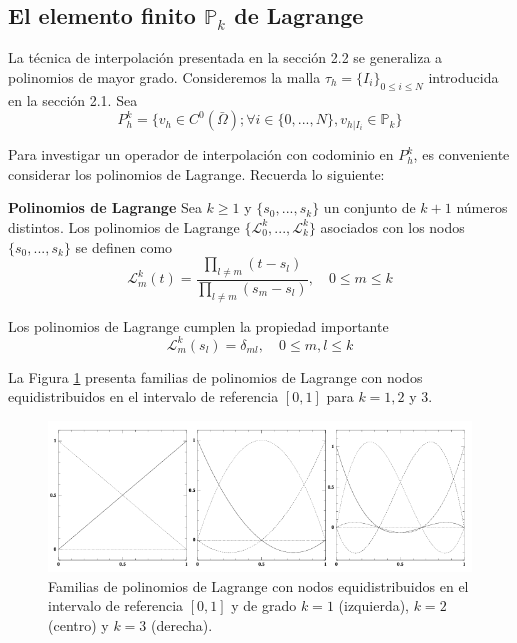 \subsection{El elemento finito $\mathbb{P}_k$ de Lagrange}
La técnica de interpolación presentada en la sección 2.2 se generaliza a polinomios de mayor grado. Consideremos la malla $\tau_h = \{I_i\}_{0 \leq i \leq N}$ introducida en la sección 2.1. Sea 
\begin{equation}
    \label{eq: TAMU 1.14}
    P_h^k = \{ v_h \in C^0 (\bar{\Omega}); \forall i \in \{ 0,..., N \}, v_{h|I_i} \in \mathbb{P}_k \}
\end{equation}

Para investigar un operador de interpolación con codominio en $P_h^k$, es conveniente considerar los polinomios de Lagrange. Recuerda lo siguiente:

\begin{definition}
    \textbf{Polinomios de Lagrange} Sea $k \geq 1$ y $\{ s_0, ..., s_k \}$ un conjunto de $k + 1$ números distintos. Los polinomios de Lagrange $\{ \mathcal{L}_0^k, ..., \mathcal{L}_k^k \}$ asociados con los nodos $\{ s_0, ..., s_k \}$ se definen como 
    \begin{equation}
        \label{eq: TAMU 1.15}
        \mathcal{L}_m^k(t) = \frac{\prod_{l \neq m} (t - s_l)}{\prod_{l \neq m}(s_m - s_l)}, \quad 0 \leq m \leq k
    \end{equation}
\end{definition}

Los polinomios de Lagrange cumplen la propiedad importante
\[ \mathcal{L}_m^k (s_l) = \delta_{ml}, \quad 0 \leq m, l \leq k \]

La Figura \ref{fig: Familias de Polinomios de Lagrange} presenta familias de polinomios de Lagrange con nodos equidistribuidos en el intervalo de referencia $[0, 1]$ para $k = 1, 2$ y $3$.

\begin{figure}[h]
    \centering
    \includegraphics[width = 0.5 \textwidth]{Imagenes/4 - Familias de Polinomios de Lagrange.png}
    \caption{Familias de polinomios de Lagrange con nodos equidistribuidos en el intervalo de referencia $[0, 1]$ y de grado $k = 1$ (izquierda), $k = 2$ (centro) y $k = 3$ (derecha).}
    \label{fig: Familias de Polinomios de Lagrange}
\end{figure}

